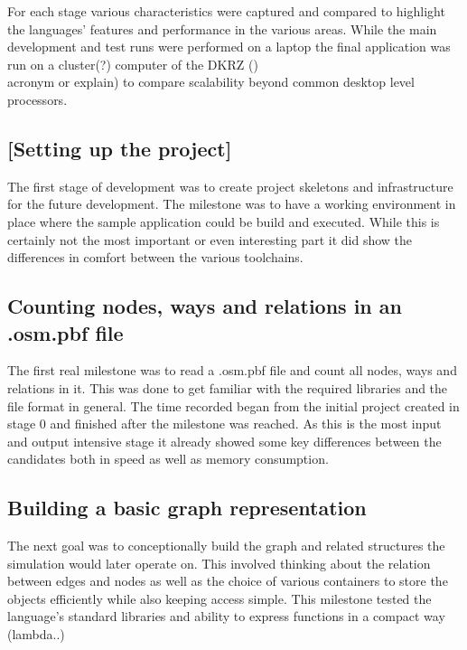 For each stage various characteristics were captured and compared to highlight the languages' features and performance in the various areas. While the main development and test runs were performed on a laptop the final application was run on a cluster(?) computer of the DKRZ ()\\acronym or explain) to compare scalability beyond common desktop level processors.

\setcounter{subsection}{-1}

\subsection{[Setting up the project]}
\label{subsec:Approach::Implementation::Setup}

The first stage of development was to create project skeletons and infrastructure for the future development. The milestone was to have a working environment in place where the sample application could be build and executed. While this is certainly not the most important or even interesting part it did show the differences in comfort between the various toolchains.

\subsection{Counting nodes, ways and relations in an .osm.pbf file}
\label{subsec:Approach::Implementation::Counting}

The first real milestone was to read a .osm.pbf file and count all nodes, ways and relations in it. This was done to get familiar with the required libraries and the file format in general. The time recorded began from the initial project created in stage 0 and finished after the milestone was reached. As this is the most input and output intensive stage it already showed some key differences between the candidates both in speed as well as memory consumption.

\subsection{Building a basic graph representation}
\label{subsec:Approach::Implementation::Graph_Representation}

The next goal was to conceptionally build the graph and related structures the simulation would later operate on. This involved thinking about the relation between edges and nodes as well as the choice of various containers to store the objects efficiently while also keeping access simple. This milestone tested the language's standard libraries and ability to express functions in a compact way (lambda..)


